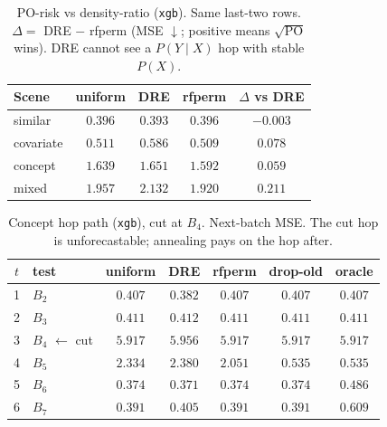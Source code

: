 \begin{table}[ht]\centering
\caption{PO-risk vs density-ratio (\texttt{xgb}).
Same last-two rows. $\Delta=$ DRE $-$ rfperm (MSE $\downarrow$;
positive means $\sqrt{\mathrm{PO}}$ wins). DRE cannot see a
$P(Y\mid X)$ hop with stable $P(X)$.}
\label{tab:po-vs-dre-xgb}
\small
\begin{tabular}{@{}lcccc@{}}\toprule
Scene & uniform & DRE & rfperm & $\Delta$ vs DRE \\
\midrule
similar & $0.396$ & $0.393$ & $0.396$ & $-0.003$ \\
covariate & $0.511$ & $0.586$ & $0.509$ & $\mathbf{0.078}$ \\
concept & $1.639$ & $1.651$ & $1.592$ & $\mathbf{0.059}$ \\
mixed & $1.957$ & $2.132$ & $1.920$ & $\mathbf{0.211}$ \\
\bottomrule
\end{tabular}
\end{table}

\begin{table}[ht]\centering
\caption{Concept hop path (\texttt{xgb}), cut at $B_4$.
Next-batch MSE. The cut hop is unforecastable; annealing pays on the hop after.}
\label{tab:po-refit-concept-xgb}
\small
\setlength{\tabcolsep}{3.5pt}
\begin{tabular}{@{}clccccc@{}}\toprule
$t$ & test & uniform & DRE & rfperm & drop-old & oracle \\
\midrule
1 & $B_{2}$ & $0.407$ & $\mathbf{0.382}$ & $0.407$ & $0.407$ & $0.407$ \\
2 & $B_{3}$ & $\mathbf{0.411}$ & $0.412$ & $\mathbf{0.411}$ & $\mathbf{0.411}$ & $0.411$ \\
3 & $B_{4}$ $\leftarrow$ cut & $\mathbf{5.917}$ & $5.956$ & $\mathbf{5.917}$ & $\mathbf{5.917}$ & $5.917$ \\
4 & $B_{5}$ & $2.334$ & $2.380$ & $2.051$ & $\mathbf{0.535}$ & $0.535$ \\
5 & $B_{6}$ & $0.374$ & $\mathbf{0.371}$ & $0.374$ & $0.374$ & $0.486$ \\
6 & $B_{7}$ & $\mathbf{0.391}$ & $0.405$ & $\mathbf{0.391}$ & $\mathbf{0.391}$ & $0.609$ \\
\bottomrule
\end{tabular}
\end{table}


